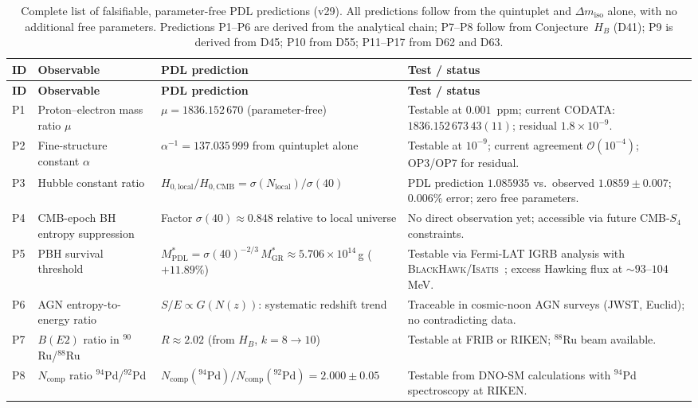 \documentclass[11pt,a4paper]{article}
\theoremstyle{plain}
\theoremstyle{definition}
\theoremstyle{remark}
\begin{document}
\begin{longtable}{L{0.5cm}L{3.2cm}L{5.2cm}L{4.2cm}}
\caption{Complete list of falsifiable, parameter-free PDL predictions (v29). All predictions follow from the quintuplet and $\Delta m_{\mathrm{iso}}$ alone, with no additional free parameters. Predictions P1--P6 are derived from the analytical chain; P7--P8 follow from Conjecture~$H_B$ (D41); P9 is derived from D45; P10 from D55; P11--P17 from D62 and D63.}
\label{tab:predictions}\\
\toprule
\textbf{ID} & \textbf{Observable} & \textbf{PDL prediction} & \textbf{Test / status}\\
\midrule
\endfirsthead
\toprule
\textbf{ID} & \textbf{Observable} & \textbf{PDL prediction} & \textbf{Test / status}\\
\midrule
\endhead
\bottomrule
\endfoot
P1 & Proton--electron mass ratio $\mu$ & $\mu=1836.152\,670$ (parameter-free) & Testable at $0.001$~ppm; current CODATA: $1836.152\,673\,43(11)$; residual $1.8\times10^{-9}$.\\[0.4em]
P2 & Fine-structure constant $\alpha$ & $\alpha^{-1}=137.035\,999$ from quintuplet alone & Testable at $10^{-9}$; current agreement $\mathcal{O}(10^{-4})$; OP3/OP7 for residual.\\[0.4em]
P3 & Hubble constant ratio & $H_{0,\mathrm{local}}/H_{0,\mathrm{CMB}}=\sigma(N_{\mathrm{local}})/\sigma(40)$ & PDL prediction $1.085935$ vs.\ observed $1.0859\pm0.007$; $0.006\%$ error; zero free parameters.\\[0.4em]
P4 & CMB-epoch BH entropy suppression & Factor $\sigma(40)\approx 0.848$ relative to local universe & No direct observation yet; accessible via future CMB-$S_4$ constraints.\\[0.4em]
P5 & PBH survival threshold & $M^*_{\mathrm{PDL}}=\sigma(40)^{-2/3}\,M^*_{\mathrm{GR}}\approx 5.706\times10^{14}$\,g ($+11.89\%$) & Testable via Fermi-LAT IGRB analysis with \textsc{BlackHawk}/\textsc{Isatis}~\cite{D45}; excess Hawking flux at $\sim93$--$104$\,MeV.\\[0.4em]
P6 & AGN entropy-to-energy ratio & $S/E\propto G(N(z))$: systematic redshift trend & Traceable in cosmic-noon AGN surveys (JWST, Euclid); no contradicting data.\\[0.4em]
P7 & $B(E2)$ ratio in $^{90}$Ru/$^{88}$Ru & $R\approx 2.02$ (from $H_B$, $k=8\to10$) & Testable at FRIB or RIKEN; $^{88}$Ru beam available.\\[0.4em]
P8 & $N_{\mathrm{comp}}$ ratio $^{94}$Pd/$^{92}$Pd & $N_{\mathrm{comp}}(^{94}\mathrm{Pd})/N_{\mathrm{comp}}(^{92}\mathrm{Pd})=2.000\pm0.05$ & Testable from DNO-SM calculations with $^{94}$Pd spectroscopy at RIKEN.\\[0.4em]

\end{longtable}
\end{document}
